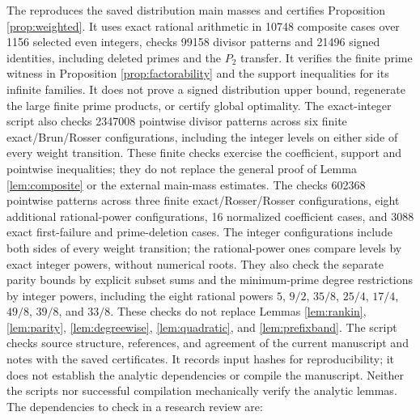 \documentclass[11pt]{article}
\begin{document}
The 
reproduces the saved distribution main masses and certifies Proposition
\ref{prop:weighted}. It uses exact rational arithmetic in 10748 composite
cases over 1156 selected even integers, checks 99158 divisor patterns and
21496 signed identities, including deleted primes and the $P_2$ transfer.
It verifies the finite prime witness in Proposition \ref{prop:factorability}
and the support inequalities for its infinite families.
It does not prove a signed distribution upper bound, regenerate the
large finite prime products, or certify global optimality.
The exact-integer script 
also checks 2347008 pointwise divisor patterns across six finite
exact/Brun/Rosser configurations, including the integer levels on either side
of every weight transition. These finite checks exercise the coefficient,
support and pointwise inequalities; they do not replace the general
proof of Lemma \ref{lem:composite} or the external main-mass estimates.
The  checks 602368
pointwise patterns across three finite exact/Rosser/Rosser configurations,
eight additional rational-power configurations, 16 normalized coefficient
cases, and 3088 exact first-failure and prime-deletion cases. The integer
configurations include both sides of every weight transition; the rational-power
ones compare levels by exact integer powers, without numerical roots.
They also check the separate parity bounds by explicit subset sums and
the minimum-prime degree restrictions by integer powers, including the
eight rational powers $5$, $9/2$, $35/8$, $25/4$, $17/4$,
$49/8$, $39/8$, and $33/8$.
These checks do not replace Lemmas \ref{lem:rankin}, \ref{lem:parity},
\ref{lem:degreewise}, \ref{lem:quadratic}, and \ref{lem:prefixband}.
The script  checks source
structure, references, and agreement of the current manuscript and notes
with the saved certificates. It records input hashes for reproducibility;
it does not establish the analytic dependencies or compile the manuscript.
Neither the scripts nor successful compilation mechanically verify the
analytic lemmas. The dependencies to check in a research review are:
\end{document}
